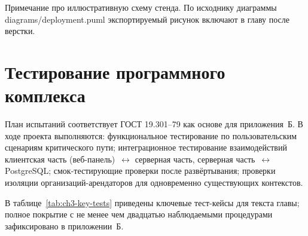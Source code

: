 
Примечание про иллюстративную схему стенда. По исходнику диаграммы diagrams/deployment.puml экспортируемый рисунок включают в главу после верстки. %

\section{Тестирование программного комплекса}

План испытаний соответствует ГОСТ 19.301--79 как основе для приложения~Б\cite{gost1930179,iso29119}. В ходе проекта выполняются: функциональное тестирование по пользовательским сценариям критического пути; интеграционное тестирование взаимодействий клиентская часть (веб-панель)~\(\leftrightarrow\) серверная часть, серверная часть~\(\leftrightarrow\) PostgreSQL; смок-тестирующие проверки после развёртывания; проверки изоляции организаций-арендаторов для одновременно существующих контекстов.

В таблице~\ref{tab:ch3-key-tests} приведены ключевые тест-кейсы для текста главы; полное покрытие с не менее чем двадцатью наблюдаемыми процедурами зафиксировано в приложении~Б\cite{kulikov_testing_2024,kaner_testing_en}.

